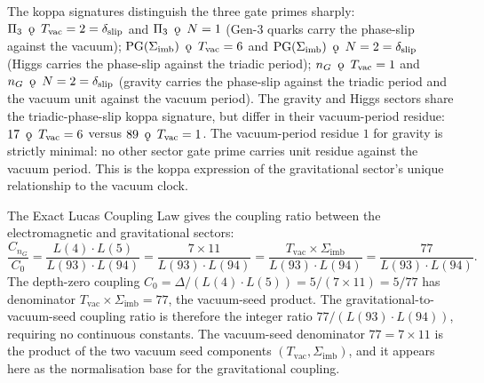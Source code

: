 \documentclass[11pt, letterpaper]{article}
\newcommand{\koppa}{\mathbin{\text{\rm\k{o}}}}
\theoremstyle{definition}
\theoremstyle{plain}
\begin{document}
\begin{observebox}
The koppa signatures distinguish the three gate primes sharply:
$\Pi_3 \;\mathbin{\koppa}\; T_\mathrm{vac} = 2 = \delta_\mathrm{slip}$ and
$\Pi_3 \;\mathbin{\koppa}\; N = 1$ (Gen-3 quarks carry the phase-slip against the vacuum);
$\mathrm{PG}(\Sigma_\mathrm{imb}) \;\mathbin{\koppa}\; T_\mathrm{vac} = 6$ and
$\mathrm{PG}(\Sigma_\mathrm{imb}) \;\mathbin{\koppa}\; N = 2 = \delta_\mathrm{slip}$
(Higgs carries the phase-slip against the triadic period);
$n_G \;\mathbin{\koppa}\; T_\mathrm{vac} = 1$ and
$n_G \;\mathbin{\koppa}\; N = 2 = \delta_\mathrm{slip}$
(gravity carries the phase-slip against the triadic period and the vacuum unit against
the vacuum period). The gravity and Higgs sectors share the triadic-phase-slip koppa
signature, but differ in their vacuum-period residue: $17 \;\mathbin{\koppa}\; T_\mathrm{vac}
= 6$ versus $89 \;\mathbin{\koppa}\; T_\mathrm{vac} = 1$. The vacuum-period residue $1$
for gravity is strictly minimal: no other sector gate prime carries unit residue against
the vacuum period. This is the koppa expression of the gravitational sector's unique
relationship to the vacuum clock.

The Exact Lucas Coupling Law gives the coupling ratio between the electromagnetic
and gravitational sectors:
\[
\frac{C_{n_G}}{C_0}
= \frac{L(4) \cdot L(5)}{L(93) \cdot L(94)}
= \frac{7 \times 11}{L(93) \cdot L(94)}
= \frac{T_\mathrm{vac} \times \Sigma_\mathrm{imb}}{L(93) \cdot L(94)}
= \frac{77}{L(93) \cdot L(94)}.
\]
The depth-zero coupling $C_0 = \Delta/(L(4) \cdot L(5)) = 5/(7 \times 11) = 5/77$ has
denominator $T_\mathrm{vac} \times \Sigma_\mathrm{imb} = 77$, the vacuum-seed product.
The gravitational-to-vacuum-seed coupling ratio is therefore the integer ratio $77 / (L(93)
\cdot L(94))$, requiring no continuous constants. The vacuum-seed denominator $77 = 7 \times 11$
is the product of the two vacuum seed components $(T_\mathrm{vac}, \Sigma_\mathrm{imb})$,
and it appears here as the normalisation base for the gravitational coupling.
\end{observebox}
\end{document}
